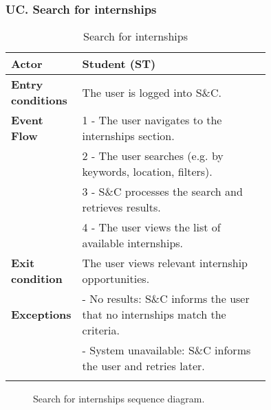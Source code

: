 \subsubsection*{UC\cuc . Search for internships}
\begin{center}
    \begin{longtable}{|l|p{0.75\linewidth}|}
        \hline
        \textbf{Actor}            & Student (ST) \\
        \hline
        \textbf{Entry conditions} & The user is logged into S\&C. \\
        \hline
        \textbf{Event Flow}       & 1 - The user navigates to the internships section. \\
        & 2 - The user searches (e.g. by keywords, location, filters). \\
        & 3 - S\&C processes the search and retrieves results. \\
        & 4 - The user views the list of available internships. \\
        \hline
        \textbf{Exit condition}   & The user views relevant internship opportunities. \\       
        \hline
        \textbf{Exceptions}       & - No results: S\&C informs the user that no internships match the criteria. \\
                                  & - System unavailable: S\&C informs the user and retries later. \\
        \hline
        \caption{Search for internships}
        \label{tab:search_internships_usecase}
    \end{longtable}
\end{center}

\begin{figure}[H]
    \begin{center}
        
        \caption{Search for internships sequence diagram.}
        \label{fig:search_internships_seqd}%
    \end{center}
\end{figure}

